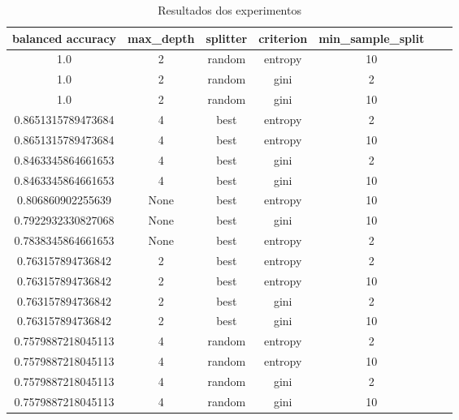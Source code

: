\documentclass[a4paper,11pt]{article}
\begin{document}
\begin{table}[htbp]
    \centering
    \caption{Resultados dos experimentos}
    \label{tab:resultados}
    \begin{tabular}{ccccccc}
        \toprule
        balanced accuracy  & max\_depth & splitter & criterion & min\_sample\_split \\
        \midrule
        1.0                & 2          & random   & entropy   & 10                 \\
        1.0                & 2          & random   & gini      & 2                  \\
        1.0                & 2          & random   & gini      & 10                 \\
        0.8651315789473684 & 4          & best     & entropy   & 2                  \\
        0.8651315789473684 & 4          & best     & entropy   & 10                 \\
        0.8463345864661653 & 4          & best     & gini      & 2                  \\
        0.8463345864661653 & 4          & best     & gini      & 10                 \\
        0.806860902255639  & None       & best     & entropy   & 10                 \\
        0.7922932330827068 & None       & best     & gini      & 10                 \\
        0.7838345864661653 & None       & best     & entropy   & 2                  \\
        0.763157894736842  & 2          & best     & entropy   & 2                  \\
        0.763157894736842  & 2          & best     & entropy   & 10                 \\
        0.763157894736842  & 2          & best     & gini      & 2                  \\
        0.763157894736842  & 2          & best     & gini      & 10                 \\
        0.7579887218045113 & 4          & random   & entropy   & 2                  \\
        0.7579887218045113 & 4          & random   & entropy   & 10                 \\
        0.7579887218045113 & 4          & random   & gini      & 2                  \\
        0.7579887218045113 & 4          & random   & gini      & 10                 \\

\end{tabular}
\end{table}
\end{document}
